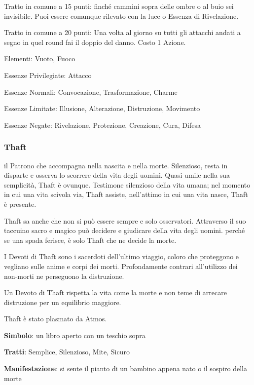 \documentclass[a4paper,11pt,twoside,openany]{book}
\begin{document}
Tratto in comune a 15 punti: finché cammini sopra delle ombre o al buio sei invisibile. Puoi essere comunque rilevato con la luce o Essenza di Rivelazione.

Tratto in comune a 20 punti: Una volta al giorno su tutti gli attacchi andati a segno in quel round fai il doppio del danno. Costo 1 Azione.

\bigskip

Elementi: Vuoto, Fuoco

\bigskip

Essenze Privilegiate: Attacco

Essenze Normali: Convocazione, Trasformazione, Charme

Essenze Limitate: Illusione, Alterazione, Distruzione, Movimento

Essenze Negate: Rivelazione, Protezione, Creazione, Cura, Difesa

\subsubsection{Thaft}

\label{thaft}

il Patrono che accompagna nella nascita e nella morte. Silenzioso, resta in disparte e osserva lo scorrere della vita degli uomini. Quasi umile nella sua semplicità, Thaft è ovunque. Testimone silenzioso della vita umana; nel momento in cui una vita scivola via, Thaft assiste, nell'attimo in cui una vita nasce, Thaft è presente.

Thaft sa anche che non si può essere sempre e solo osservatori. Attraverso il suo taccuino sacro e magico può decidere e giudicare della vita degli uomini. perché se una spada ferisce, è solo Thaft che ne decide la morte.

I Devoti di Thaft sono i sacerdoti dell'ultimo viaggio, coloro che proteggono e vegliano sulle anime e corpi dei morti. Profondamente contrari all'utilizzo dei non-morti ne perseguono la distruzione.

Un Devoto di Thaft rispetta la vita come la morte e non teme di arrecare distruzione per un equilibrio maggiore.

Thaft è stato plasmato da Atmos.

\textbf{Simbolo}: un libro aperto con un teschio sopra

\textbf{Tratti}: Semplice, Silenzioso, Mite, Sicuro

\textbf{Manifestazione}: si sente il pianto di un bambino appena nato o il sospiro della morte
\end{document}
